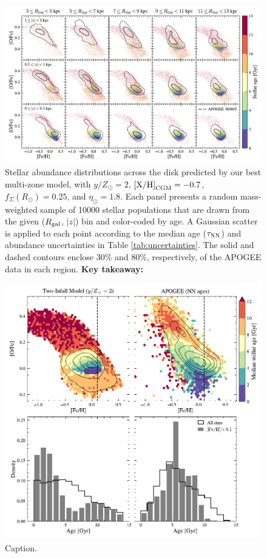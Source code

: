 \documentclass[twocolumn,twocolappendix,linenumbers]{aastex631}
\newcommand{\yZ}[1]{$y/Z_\odot=#1$}
\begin{document}
\begin{figure}
    \centering
    \includegraphics[width=\textwidth]{figures/ofe_feh_best.pdf}
    \caption{Stellar abundance distributions across the disk predicted by our best multi-zone model, with \yZ{2}, ${\rm [X/H]}_{\rm CGM}=-0.7$, $f_\Sigma(R_\odot)=0.25$, and $\eta_\odot=1.8$. Each panel presents a random mass-weighted sample of \num{10000} stellar populations that are drawn from the given ($R_{\rm gal}$, $|z|$) bin and color-coded by age. A Gaussian scatter is applied to each point according to the median age ($\tau_{\rm NN}$) and abundance uncertainties in Table \ref{tab:uncertainties}. The solid and dashed contours enclose 30\% and 80\%, respectively, of the APOGEE data in each region. {\bf Key takeaway:} }
    \label{fig:ofe-feh-best}
\end{figure}

\begin{figure}
    \centering
    \includegraphics[width=\textwidth]{figures/lmr_ages.pdf}
    \caption{Caption.}
    \label{fig:lmr-ages}
\end{figure}
\end{document}
